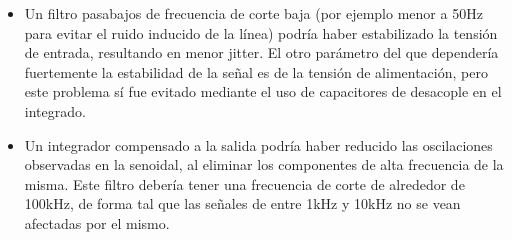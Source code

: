 \documentclass[../../tc_tp6_main.tex]{subfiles}
\begin{document}
\begin{itemize}
	\item Un filtro pasabajos de frecuencia de corte baja (por ejemplo menor a 50Hz para evitar el ruido inducido de la l\'inea) podr\'ia haber estabilizado la tensi\'on de entrada, resultando en menor jitter. El otro par\'ametro del que depender\'ia fuertemente la estabilidad de la se\~nal es de la tensi\'on de alimentaci\'on, pero este problema s\'i fue evitado mediante el uso de capacitores de desacople en el integrado. 
	\item Un integrador compensado a la salida podr\'ia haber reducido las oscilaciones observadas en la senoidal, al eliminar los componentes de alta frecuencia de la misma. Este filtro deber\'ia tener una frecuencia de corte de alrededor de 100kHz, de forma tal que las se\~nales de entre 1kHz y 10kHz no se vean afectadas por el mismo.
\end{itemize}
\end{document}
